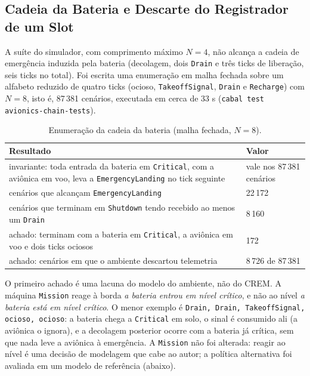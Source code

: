 \documentclass[12pt,a4paper]{article}
\begin{document}
\subsection{Cadeia da Bateria e Descarte do Registrador de um Slot}

A suíte do simulador, com comprimento máximo $N = 4$, não alcança a cadeia de emergência induzida pela bateria (decolagem, dois \texttt{Drain} e três ticks de liberação, seis ticks no total). Foi escrita uma enumeração em malha fechada sobre um alfabeto reduzido de quatro ticks (ocioso, \texttt{TakeoffSignal}, \texttt{Drain} e \texttt{Recharge}) com $N = 8$, isto é, 87\,381 cenários, executada em cerca de 33 s (\texttt{cabal test avionics-chain-tests}).

\begin{table}[h]
\centering
\footnotesize
\begin{tabular}{|p{10.4cm}|p{3.3cm}|}
\hline
Resultado & Valor \\
\hline
invariante: toda entrada da bateria em \texttt{Critical}, com a aviônica em voo, leva a \texttt{EmergencyLanding} no tick seguinte & vale nos 87\,381 cenários \\
\hline
cenários que alcançam \texttt{EmergencyLanding} & 22\,172 \\
\hline
cenários que terminam em \texttt{Shutdown} tendo recebido ao menos um \texttt{Drain} & 8\,160 \\
\hline
achado: terminam com a bateria em \texttt{Critical}, a aviônica em voo e dois ticks ociosos & 172 \\
\hline
achado: cenários em que o ambiente descartou telemetria & 8\,726 de 87\,381 \\
\hline
\end{tabular}
\caption{Enumeração da cadeia da bateria (malha fechada, $N = 8$).}
\end{table}

O primeiro achado é uma lacuna do modelo do ambiente, não do CREM. A máquina \texttt{Mission} reage à borda \textit{a bateria entrou em nível crítico}, e não ao nível \textit{a bateria está em nível crítico}. O menor exemplo é \texttt{Drain, Drain, TakeoffSignal, ocioso, ocioso}: a bateria chega a \texttt{Critical} em solo, o sinal é consumido ali (a aviônica o ignora), e a decolagem posterior ocorre com a bateria já crítica, sem que nada leve a aviônica à emergência. A \texttt{Mission} não foi alterada: reagir ao nível é uma decisão de modelagem que cabe ao autor; a política alternativa foi avaliada em um modelo de referência (abaixo).
\end{document}
